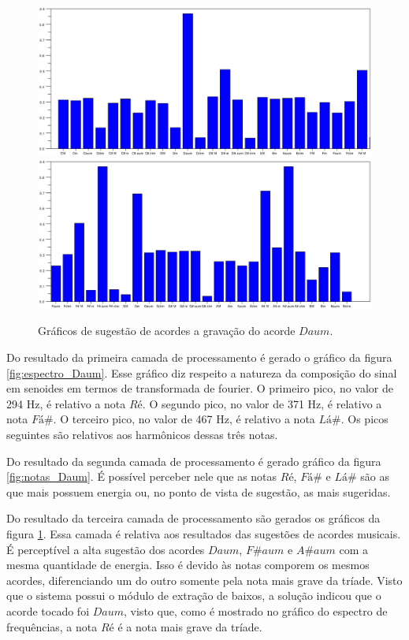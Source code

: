 \begin{figure}[h]
	\centering
		\includegraphics[keepaspectratio=true,scale=0.49]{figuras/Dm/acordes_1_Daum.eps}
		\includegraphics[keepaspectratio=true,scale=0.49]{figuras/Dm/acordes_2_Daum.eps}
	\caption{Gráficos de sugestão de acordes a gravação do acorde $Daum$.}
  \label{fig:acordes_Daum}
\end{figure}
\newpage

Do resultado da primeira camada de processamento é gerado o gráfico da figura \ref{fig:espectro_Daum}. Esse gráfico diz respeito a natureza da composição do sinal em senoides em termos de transformada de fourier. O primeiro pico, no valor de 294 Hz, é relativo a nota $Ré$. O segundo pico, no valor de 371 Hz, é relativo a nota $Fá\#$. O terceiro pico, no valor de 467 Hz, é relativo a nota $Lá\#$. Os picos seguintes são relativos aos harmônicos dessas três notas.

Do resultado da segunda camada de processamento é gerado gráfico da figura \ref{fig:notas_Daum}. É possível perceber nele que as notas $Ré$, $Fá\#$ e $Lá\#$ são as que mais possuem energia ou, no ponto de vista de sugestão, as mais sugeridas.

Do resultado da terceira camada de processamento são gerados os gráficos da figura \ref{fig:acordes_Daum}. Essa camada é relativa aos resultados das sugestões de acordes musicais. É perceptível a alta sugestão dos acordes $Daum$, $F\#aum$ e $A\#aum$ com a mesma quantidade de energia. Isso é devido às notas comporem os mesmos acordes, diferenciando um do outro somente pela nota mais grave da tríade. Visto que o sistema possui o módulo de extração de baixos, a solução indicou que o acorde tocado foi $Daum$, visto que, como é mostrado no gráfico do espectro de frequências, a nota $Ré$ é a nota mais grave da tríade.

